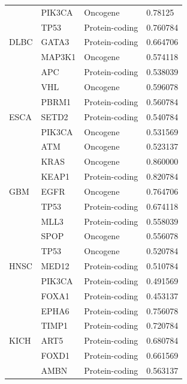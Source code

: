 \begin{table}
\begin{center}
{\begin{tabular}{l|l|l|l}
        \midrule
        \multirow{5}{*}{DLBC} & PIK3CA & Oncogene & 0.78125 \\ %
        & TP53 & Protein-coding & 0.760784 \\ %
        & GATA3  & Protein-coding & 0.664706 \\ %
        & MAP3K1  & Oncogene & 0.574118 \\ %
        & APC   & Protein-coding & 0.538039 \\ 
        \midrule
        \multirow{5}{*}{ESCA} & VHL & Oncogene & 0.596078 \\ %
        & PBRM1 & Protein-coding  & 0.560784 \\ %
        & SETD2 & Protein-coding & 0.540784 \\ %
        & PIK3CA & Oncogene & 0.531569 \\ %
        & ATM & Oncogene & 0.523137 \\ %
        \midrule
        \multirow{5}{*}{GBM}& KRAS & Oncogene & 0.860000 \\ %
        & KEAP1 & Protein-coding & 0.820784 \\ %
        & EGFR & Oncogene & 0.764706 \\ %
        & TP53 & Protein-coding & 0.674118 \\ %
        & MLL3 & Protein-coding & 0.558039 \\ %
        \midrule
        \multirow{5}{*}{HNSC}& SPOP & Oncogene & 0.556078 \\ %
        & TP53 & Oncogene & 0.520784 \\ %
        & MED12 & Protein-coding & 0.510784 \\ %
        & PIK3CA & Protein-coding & 0.491569 \\ %
        & FOXA1 & Protein-coding & 0.453137 \\ %
        \midrule
        \multirow{5}{*}{KICH}& EPHA6 & Protein-coding & 0.756078 \\ %
        & TIMP1 & Protein-coding & 0.720784 \\ %
        & ART5 & Protein-coding & 0.680784 \\ %
        & FOXD1 & Protein-coding & 0.661569 \\ %
        & AMBN & Protein-coding & 0.563137 \\ %

\end{tabular}}
\end{center}
\end{table}
